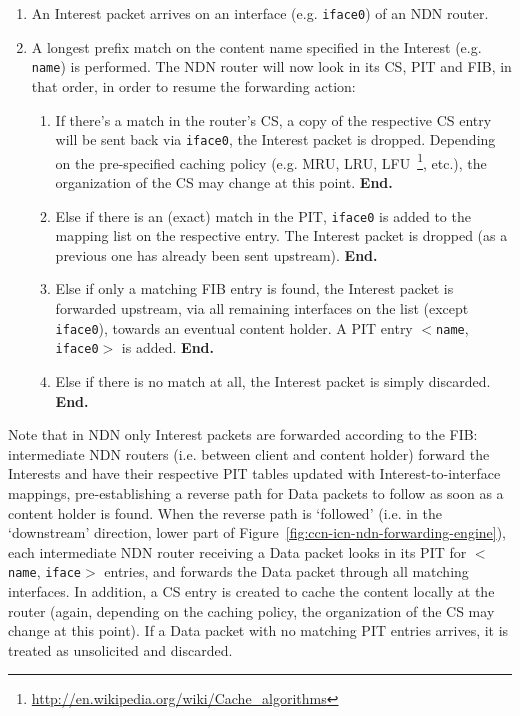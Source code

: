 \begin{enumerate}

    \item An Interest packet arrives on an interface (e.g. \verb+iface0+) of an NDN router.
    \item A longest prefix match on the content name specified in the Interest (e.g. \verb+name+) 
        is performed. The NDN router will now look in its CS, PIT and FIB, in 
        that order, in order to resume the forwarding action:
        \begin{enumerate}

            \item If there's a match in the router's CS, a copy of the respective 
                CS entry will be sent back via \verb+iface0+, the Interest 
                packet is dropped. Depending on the pre-specified 
                caching policy (e.g. MRU, LRU, LFU~\footnote{\url{http://en.wikipedia.org/wiki/Cache_algorithms}}, 
                etc.), the organization of the CS 
                may change at this point. \textbf{End.}

            \item Else if there is an (exact) match in the PIT, \verb+iface0+ is 
                added to the mapping list on the respective entry. The 
                Interest packet is dropped (as a previous one has already been 
                sent upstream). \textbf{End.}

            \item Else if only a matching FIB entry is found, the Interest 
                packet is forwarded upstream, via all remaining interfaces on the 
                list (except \verb+iface0+), towards an eventual content holder. A PIT 
                entry $<$\verb+name+, \verb+iface0+$>$ is added. \textbf{End.}

            \item Else if there is no match at all, the Interest packet is 
                simply discarded. \textbf{End.}\shortvertbreak

        \end{enumerate}

\end{enumerate}

Note that in NDN only Interest packets are forwarded according to the FIB: 
intermediate NDN 
routers (i.e. between client and content holder) forward the 
Interests and have their respective PIT tables updated with Interest-to-interface 
mappings, pre-establishing a reverse path for Data packets to follow as soon as a 
content holder is found. When the reverse path is `followed' (i.e. in the 
`downstream' direction, lower part of Figure~\ref{fig:ccn-icn-ndn-forwarding-engine}), each 
intermediate NDN router receiving a 
Data packet looks in its PIT for $<$\verb+name+, \verb+iface+$>$ entries, 
and forwards the Data packet through all matching interfaces. In addition, a 
CS entry is created to cache the content locally at the router (again, depending 
on the caching policy, the organization of the CS may change at this point). If a Data packet 
with no matching PIT entries arrives, it is treated as unsolicited and discarded.

